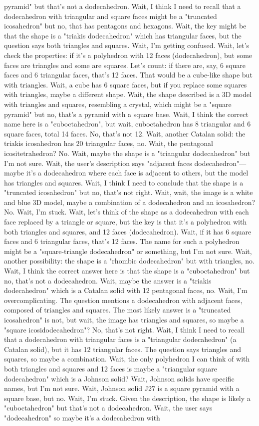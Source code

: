 pyramid" but that's not a dodecahedron. Wait, I think I need to recall that a dodecahedron with triangular and square faces might be a "truncated icosahedron" but no, that has pentagons and hexagons. Wait, the key might be that the shape is a "triakis dodecahedron" which has triangular faces, but the question says both triangles and squares. Wait, I'm getting confused. Wait, let's check the properties: if it's a polyhedron with 12 faces (dodecahedron), but some faces are triangles and some are squares. Let's count: if there are, say, 6 square faces and 6 triangular faces, that's 12 faces. That would be a cube-like shape but with triangles. Wait, a cube has 6 square faces, but if you replace some squares with triangles, maybe a different shape. Wait, the shape described is a 3D model with triangles and squares, resembling a crystal, which might be a "square pyramid" but no, that's a pyramid with a square base. Wait, I think the correct name here is a "cuboctahedron", but wait, cuboctahedron has 8 triangular and 6 square faces, total 14 faces. No, that's not 12. Wait, another Catalan solid: the triakis icosahedron has 20 triangular faces, no. Wait, the pentagonal icositetrahedron? No. Wait, maybe the shape is a "triangular dodecahedron" but I'm not sure. Wait, the user's description says "adjacent faces dodecahedron"—maybe it's a dodecahedron where each face is adjacent to others, but the model has triangles and squares. Wait, I think I need to conclude that the shape is a "truncated icosahedron" but no, that's not right. Wait, wait, the image is a white and blue 3D model, maybe a combination of a dodecahedron and an icosahedron? No. Wait, I'm stuck. Wait, let's think of the shape as a dodecahedron with each face replaced by a triangle or square, but the key is that it's a polyhedron with both triangles and squares, and 12 faces (dodecahedron). Wait, if it has 6 square faces and 6 triangular faces, that's 12 faces. The name for such a polyhedron might be a "square-triangle dodecahedron" or something, but I'm not sure. Wait, another possibility: the shape is a "rhombic dodecahedron" but with triangles, no. Wait, I think the correct answer here is that the shape is a "cuboctahedron" but no, that's not a dodecahedron. Wait, maybe the answer is a "triakis dodecahedron" which is a Catalan solid with 12 pentagonal faces, no. Wait, I'm overcomplicating. The question mentions a dodecahedron with adjacent faces, composed of triangles and squares. The most likely answer is a "truncated icosahedron" is not, but wait, the image has triangles and squares, so maybe a "square icosidodecahedron"? No, that's not right. Wait, I think I need to recall that a dodecahedron with triangular faces is a "triangular dodecahedron" (a Catalan solid), but it has 12 triangular faces. The question says triangles and squares, so maybe a combination. Wait, the only polyhedron I can think of with both triangles and squares and 12 faces is maybe a "triangular square dodecahedron" which is a Johnson solid? Wait, Johnson solids have specific names, but I'm not sure. Wait, Johnson solid J27 is a square pyramid with a square base, but no. Wait, I'm stuck. Given the description, the shape is likely a "cuboctahedron" but that's not a dodecahedron. Wait, the user says "dodecahedron" so maybe it's a dodecahedron with 